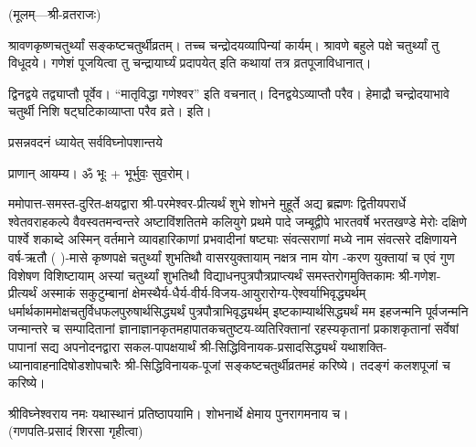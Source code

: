 
\centerline{\small{(मूलम्—श्री-व्रतराजः)}}

श्रावणकृष्णचतुर्थ्यां सङ्कष्टचतुर्थीव्रतम्। तच्च चन्द्रोदयव्यापिन्यां कार्यम्। श्रावणे बहुले पक्षे चतुर्थ्यां तु विधूदये। गणेशं पूजयित्वा तु चन्द्रायार्घ्यं प्रदापयेत् इति कथायां तत्र व्रतपूजाविधानात्।

द्विनद्वये तद्व्याप्तौ पूर्वेव। “मातृविद्धा गणेश्वर” इति वचनात्। दिनद्वयेऽव्याप्तौ परैव। हेमाद्रौ चन्द्रोदयाभावे चतुर्थी निशि षट्घटिकाव्याप्ता परैव व्रते। इति।




{प्रसन्नवदनं ध्यायेत् सर्वविघ्नोपशान्तये}

प्राणान् आयम्य। ॐ भूः + भूर्भुवः॒ सुव॒रोम्।


ममोपात्त-समस्त-दुरित-क्षयद्वारा श्री-परमेश्वर-प्रीत्यर्थं शुभे शोभने मुहूर्ते अद्य ब्रह्मणः
द्वितीयपरार्धे श्वेतवराहकल्पे वैवस्वतमन्वन्तरे अष्टाविंशतितमे कलियुगे प्रथमे पादे
जम्बूद्वीपे भारतवर्षे भरतखण्डे मेरोः दक्षिणे पार्श्वे शकाब्दे अस्मिन् वर्तमाने व्यावहारिकाणां
प्रभवादीनां षष्ट्याः संवत्सराणां मध्ये \blank{} नाम संवत्सरे दक्षिणायने
वर्ष-ऋतौ ( )-मासे कृष्णपक्षे चतुर्थ्यां शुभतिथौ \blank{} वासरयुक्तायाम्
\blank{} नक्षत्र \blank{} नाम योग
\blank{}-करण युक्तायां च एवं गुण विशेषण विशिष्टायाम्
अस्यां चतुर्थ्यां शुभतिथौ
विद्याधनपुत्रपौत्रप्राप्त्यर्थं समस्तरोगमुक्तिकामः श्री-गणेश-प्रीत्यर्थं
अस्माकं सकुटुम्बानां क्षेमस्थैर्य-धैर्य-वीर्य-विजय-आयुरारोग्य-ऐश्वर्याभिवृद्ध्यर्थम्
धर्मार्थकाममोक्ष\-चतुर्विधफलपुरुषार्थसिद्ध्यर्थं पुत्रपौत्राभि\-वृद्ध्यर्थम् इष्टकाम्यार्थसिद्ध्यर्थं
मम इहजन्मनि पूर्वजन्मनि जन्मान्तरे च सम्पादितानां ज्ञानाज्ञानकृतमहा\-पातकचतुष्टय-व्यतिरिक्तानां
रहस्यकृतानां प्रकाशकृतानां सर्वेषां पापानां सद्य अपनोदनद्वारा
सकल-पापक्षयार्थं श्री-सिद्धिविनायक-प्रसादसिद्ध्यर्थं
यथाशक्ति-ध्यानावाहनादिषोडशोपचारैः श्री-सिद्धिविनायक-पूजां सङ्कष्टचतुर्थीव्रतमहं करिष्ये।
तदङ्गं कलशपूजां च करिष्ये।

श्रीविघ्नेश्वराय नमः यथास्थानं प्रतिष्ठापयामि। शोभनार्थे क्षेमाय पुनरागमनाय च।\\
(गणपति-प्रसादं शिरसा गृहीत्वा)

